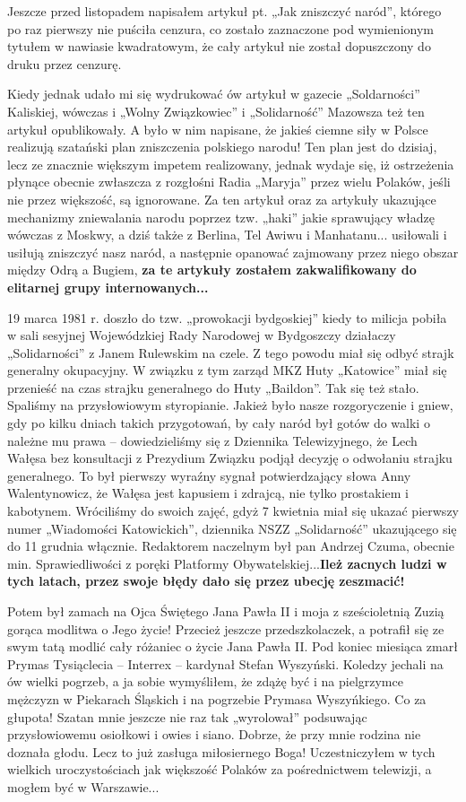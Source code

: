 Jeszcze przed listopadem napisałem artykuł pt. „Jak zniszczyć naród”, którego po raz pierwszy nie puściła cenzura, co zostało zaznaczone pod wymienionym tytułem w nawiasie kwadratowym, że cały artykuł nie został dopuszczony do druku przez cenzurę.

Kiedy jednak udało mi się wydrukować ów artykuł w gazecie „Soldarności” Kaliskiej, wówczas i „Wolny Związkowiec” i „Solidarność” Mazowsza też ten artykuł opublikowały. A było w nim napisane, że jakieś ciemne siły w Polsce realizują szatański plan zniszczenia polskiego narodu! Ten plan jest do dzisiaj, lecz ze znacznie większym impetem realizowany, jednak wydaje się, iż ostrzeżenia płynące obecnie zwłaszcza z rozgłośni Radia „Maryja” przez wielu Polaków, jeśli nie przez większość, są ignorowane. Za ten artykuł oraz za artykuły ukazujące mechanizmy zniewalania narodu poprzez tzw. „haki” jakie sprawujący władzę wówczas z Moskwy, a dziś także z Berlina, Tel Awiwu i Manhatanu... usiłowali i usiłują zniszczyć nasz naród, a następnie opanować zajmowany przez niego obszar między Odrą a Bugiem, \textbf{za te artykuły zostałem zakwalifikowany do elitarnej grupy internowanych...}

19 marca 1981 r. doszło do tzw. „prowokacji bydgoskiej” kiedy to milicja pobiła w sali sesyjnej Wojewódzkiej Rady Narodowej w Bydgoszczy działaczy „Solidarności” z Janem Rulewskim na czele. Z tego powodu miał się odbyć strajk generalny okupacyjny. W związku z tym zarząd MKZ Huty „Katowice” miał się przenieść na czas strajku generalnego do Huty „Baildon”. Tak się też stało. Spaliśmy na przysłowiowym styropianie. Jakież było nasze rozgoryczenie i gniew, gdy po kilku dniach takich przygotowań, by cały naród był gotów do walki o należne mu prawa – dowiedzieliśmy się z Dziennika Telewizyjnego, że Lech Wałęsa bez konsultacji z Prezydium Związku podjął decyzję o odwołaniu strajku generalnego. To był pierwszy wyraźny sygnał potwierdzający słowa Anny Walentynowicz, że Wałęsa jest kapusiem i zdrajcą, nie tylko prostakiem i kabotynem. Wróciliśmy do swoich zajęć, gdyż 7 kwietnia miał się ukazać pierwszy numer „Wiadomości Katowickich”, dziennika NSZZ „Solidarność” ukazującego się do 11 grudnia włącznie. Redaktorem naczelnym był pan Andrzej Czuma, obecnie min. Sprawiedliwości z poręki Platformy Obywatelskiej...\textbf{Ileż zacnych ludzi w tych latach, przez swoje błędy dało się przez ubecję zeszmacić!}

Potem był zamach na Ojca Świętego Jana Pawła II i moja z sześcioletnią Zuzią gorąca modlitwa o Jego życie! Przecież jeszcze przedszkolaczek, a potrafił się ze swym tatą modlić cały różaniec o życie Jana Pawła II. Pod koniec miesiąca zmarł Prymas Tysiąclecia – Interrex – kardynał Stefan Wyszyński. Koledzy jechali na ów wielki pogrzeb, a ja sobie wymyśliłem, że zdążę być i na pielgrzymce mężczyzn w Piekarach Śląskich i na pogrzebie Prymasa Wyszyńkiego. Co za głupota! Szatan mnie jeszcze nie raz tak „wyrolował” podsuwając przysłowiowemu osiołkowi i owies i siano. Dobrze, że przy mnie rodzina nie doznała głodu. Lecz to już zasługa miłosiernego Boga! Uczestniczyłem w tych wielkich uroczystościach jak większość Polaków za pośrednictwem telewizji, a mogłem być w Warszawie...

